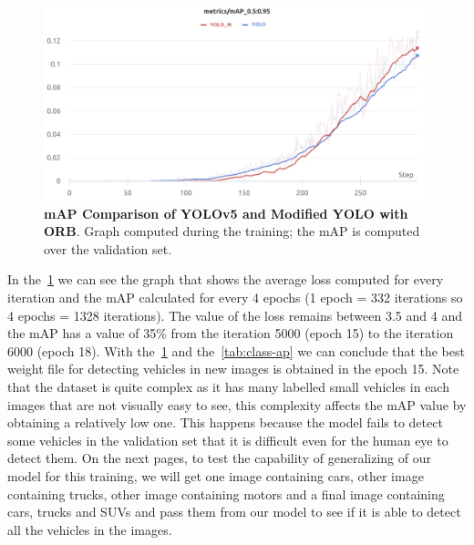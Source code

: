 \begin{figure}[H] %
  \centering
  \includegraphics[width=\textwidth]{figures/paper/mAP.png}
  \caption[The Architecture]{\textbf{mAP Comparison of YOLOv5 and Modified YOLO with ORB}. Graph computed during the training; the mAP is computed over the validation set.}
  \label{fig:figures/paper/mAP}
\end{figure}

In the~\ref{fig:figures/paper/mAP} we can see the graph that shows the average loss computed for every iteration
and  the  mAP  calculated  for  every  4  epochs  (1  epoch  =  332  iterations  so  4  epochs  =  1328
iterations). The value of the  loss remains between 3.5 and 4  and the mAP has a value of 35\%
from the iteration 5000 (epoch 15) to the iteration 6000 (epoch 18). With the~\ref{fig:figures/paper/mAP}
and the~\ref{tab:class-ap} we can conclude that the best weight file for detecting vehicles in new
images is obtained in the epoch 15. Note that the dataset is quite complex as it has many
labelled small vehicles in each images that are not visually easy to see, this complexity affects
the mAP value by obtaining a relatively low one. This happens because the model fails to detect
some vehicles in the validation set that it is difficult even for the human eye to detect them. On
the next pages, to test the capability of generalizing of our model for this training, we will get
one image containing cars, other image containing trucks, other image containing motors and a
final image containing cars, trucks and SUVs and pass them from our model to see if it is able
to detect all the vehicles in the images.



